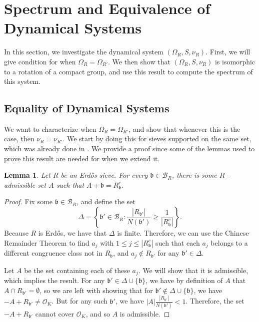 \documentclass[a4paper,11pt,reqno]{amsart}
\theoremstyle{plain}
\newtheorem{lemma}[theorem]{Lemma}
\theoremstyle{remark}
\newcommand{\cb}{\mathcal{B}}
\newcommand{\co}{\mathcal{O}}
\newcommand{\gb}{\mathfrak{b}}
\begin{document}
			
			
			
			
			
			
			
			
			\section{Spectrum and Equivalence of Dynamical Systems}
			
			
			In this section, we investigate the dynamical system $(\Omega_R,S, \nu_R)$.  First, we will give condition for when $\Omega_R = \Omega_{R'}$. We then show that $(\Omega_R,S, \nu_R)$ is isomorphic to a rotation of a compact group, and use this result to compute the spectrum of this system.
			
			
			
			
			
			\subsection{Equality of Dynamical Systems} We want to characterize when $\Omega_{R} = \Omega_{R'}$, and show that whenever this is the case, then $\nu_R = \nu_{R'}$. We start by doing this for sieves supported on the same set, which was already done in \cite{Fabian}. We provide a proof since some of the lemmas used to prove this result are needed for when we extend it.
			
			\begin{lemma}
				\label{lm: there are admissible representatives of R_gb^c  }
				Let $R$ be an Erdős sieve. For every $\gb \in \cb_R$, there is some $R-$admissible set $A$ such that $A+\gb = R_\gb^c$. 
			\end{lemma}
			
			\begin{proof}
				Fix some $\gb \in \cb_R$, and define the set $$\Delta = \left\{\gb' \in \cb_R: \frac{|R_{\gb'}|}{N(\gb')} \geq \frac{1}{|R_\gb^c|} \right\}.$$ Because $R$ is Erdős, we have that $\Delta$ is finite. Therefore, we can use the Chinese Remainder Theorem to find $a_j$ with $1 \leq j \leq |R_\gb^c|$ such that each $a_j$ belongs to  a different congruence class not in $R_\gb$, and $a_j \not \in R_{\gb'}$ for any $\gb' \in \Delta$. 
				
				Let $A$ be the set containing each of these $a_j$. We will show that it is admissible, which implies the result. For any $\gb' \in \Delta \cup \{\gb\}$, we have by definition of $A$ that $A\cap R_{\gb'} = \emptyset$, so we are left with showing that for $\gb' \not \in \Delta \cup \{\gb\}$, we have $-A+R_{\gb'} \neq \co_K$.  But for any such $\gb'$, we have $|A|\frac{|R_{\gb'}|}{N(\gb')} < 1$. Therefore, the set $-A + R_{\gb'}$ cannot cover $\co_K$, and so $A$ is admissible.
			\end{proof}
			
\end{document}
